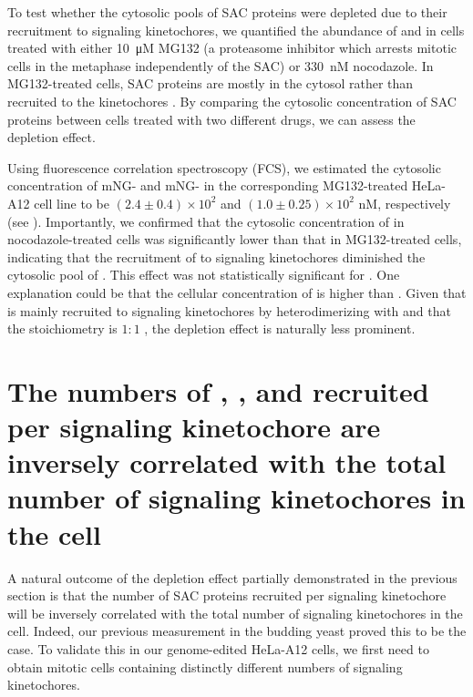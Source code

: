 To test whether the cytosolic pools of SAC proteins were depleted due to their recruitment to signaling kinetochores, we quantified the abundance of  and  in cells treated with either \SI{10}{\micro M} MG132 (a proteasome inhibitor which arrests mitotic cells in the metaphase independently of the SAC) or \SI{330}{nM} nocodazole. In MG132-treated cells, SAC proteins are mostly in the cytosol rather than recruited to the kinetochores \cite{MG132, Suijkerbuijk2012}. By comparing the cytosolic concentration of SAC proteins between cells treated with two different drugs, we can assess the depletion effect.

Using fluorescence correlation spectroscopy (FCS), we estimated the cytosolic concentration of mNG- and mNG- in the corresponding MG132-treated HeLa-A12 cell line to be $(2.4 \pm 0.4) \times 10^2$ and $(1.0 \pm 0.25) \times 10^2$ nM, respectively (see ). Importantly, we confirmed that the cytosolic concentration of  in nocodazole-treated cells was significantly lower than that in MG132-treated cells, indicating that the recruitment of  to signaling kinetochores diminished the cytosolic pool of . This effect was not statistically significant for . One explanation could be that the cellular concentration of  is higher than . Given that  is mainly recruited to signaling kinetochores by heterodimerizing with  and that the stoichiometry is $1:1$  \cite{BubBiochem}, the depletion effect is naturally less prominent. %

\section{The numbers of , , and  recruited per signaling kinetochore are inversely correlated with the total number of signaling kinetochores in the cell}

A natural outcome of the depletion effect partially demonstrated in the previous section is that the number of SAC proteins recruited per signaling kinetochore will be inversely correlated with the total number of signaling kinetochores in the cell. Indeed, our previous measurement in the budding yeast \cite{Aravamudhan2016} proved this to be the case. To validate this in our genome-edited HeLa-A12 cells, we first need to obtain mitotic cells containing distinctly different numbers of signaling kinetochores.

